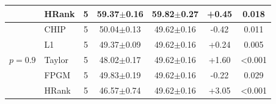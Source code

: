 \begin{table}[t]
\begin{tabular*}{\textwidth}{@{\extracolsep\fill}llccccc}
 & HRank & 5 & 59.37$\pm$0.16 & 59.82$\pm$0.27 & +0.45 & 0.018 \\
\midrule
\multirow{5}{*}{$p=0.9$} & CHIP & 5 & 50.04$\pm$0.13 & 49.62$\pm$0.16 & -0.42 & 0.011 \\
 & L1 & 5 & 49.37$\pm$0.09 & 49.62$\pm$0.16 & +0.24 & 0.005 \\
 & Taylor & 5 & 48.02$\pm$0.17 & 49.62$\pm$0.16 & +1.60 & <0.001 \\
 & FPGM & 5 & 49.83$\pm$0.19 & 49.62$\pm$0.16 & -0.22 & 0.029 \\
 & HRank & 5 & 46.57$\pm$0.74 & 49.62$\pm$0.16 & +3.05 & <0.001 \\
\bottomrule
\end{tabular*}
\end{table}
